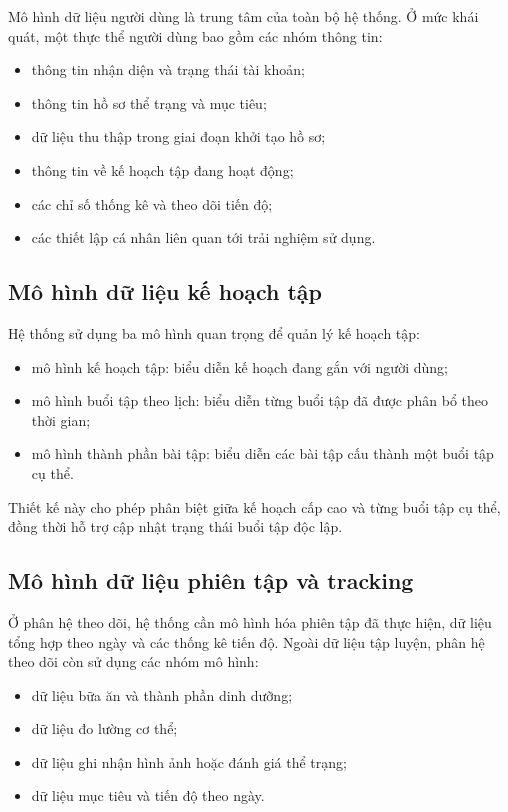 Mô hình dữ liệu người dùng là trung tâm của toàn bộ hệ thống. Ở mức khái quát, một thực thể người dùng bao gồm các nhóm thông tin:

\begin{itemize}
    \item thông tin nhận diện và trạng thái tài khoản;
    \item thông tin hồ sơ thể trạng và mục tiêu;
    \item dữ liệu thu thập trong giai đoạn khởi tạo hồ sơ;
    \item thông tin về kế hoạch tập đang hoạt động;
    \item các chỉ số thống kê và theo dõi tiến độ;
    \item các thiết lập cá nhân liên quan tới trải nghiệm sử dụng.
\end{itemize}

\subsection{Mô hình dữ liệu kế hoạch tập}

Hệ thống sử dụng ba mô hình quan trọng để quản lý kế hoạch tập:

\begin{itemize}
    \item mô hình kế hoạch tập: biểu diễn kế hoạch đang gắn với người dùng;
    \item mô hình buổi tập theo lịch: biểu diễn từng buổi tập đã được phân bổ theo thời gian;
    \item mô hình thành phần bài tập: biểu diễn các bài tập cấu thành một buổi tập cụ thể.
\end{itemize}

Thiết kế này cho phép phân biệt giữa kế hoạch cấp cao và từng buổi tập cụ thể, đồng thời hỗ trợ cập nhật trạng thái buổi tập độc lập.

\subsection{Mô hình dữ liệu phiên tập và tracking}

Ở phân hệ theo dõi, hệ thống cần mô hình hóa phiên tập đã thực hiện, dữ liệu tổng hợp theo ngày và các thống kê tiến độ. Ngoài dữ liệu tập luyện, phân hệ theo dõi còn sử dụng các nhóm mô hình:

\begin{itemize}
    \item dữ liệu bữa ăn và thành phần dinh dưỡng;
    \item dữ liệu đo lường cơ thể;
    \item dữ liệu ghi nhận hình ảnh hoặc đánh giá thể trạng;
    \item dữ liệu mục tiêu và tiến độ theo ngày.
\end{itemize}

